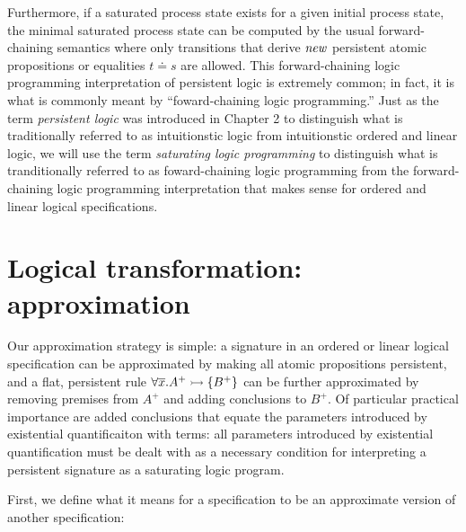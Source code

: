Furthermore, if a saturated process state exists for a given initial
process state, the minimal saturated process state can be computed by
the usual forward-chaining semantics where only transitions that
derive ${\it new}$ persistent atomic propositions or equalities $t
\doteq s$ are allowed. This forward-chaining logic programming
interpretation of persistent logic is extremely common; in fact, it is
what is commonly meant by ``foward-chaining logic programming.'' Just
as the term {\it persistent logic} was introduced in Chapter 2 to
distinguish what is traditionally referred to as intuitionstic logic
from intuitionstic ordered and linear logic, we will use the term
{\it saturating logic programming} to distinguish what is
tranditionally referred to as foward-chaining logic programming from
the forward-chaining logic programming interpretation that makes sense
for ordered and linear logical specifications.

\section{Logical transformation: approximation}
\label{sec:abstraction}

Our approximation strategy is simple: a signature in an ordered or
linear logical specification can be approximated by making all atomic
propositions persistent, and a flat, persistent rule $\forall
\overline{x}. A^+ \rightarrowtail \{ B^+ \}$ can be further approximated by
removing premises from $A^+$ and adding conclusions to $B^+$. Of
particular practical importance are added conclusions that equate the
parameters introduced by existential quantificaiton with terms: all
parameters introduced by existential quantification must be dealt with
as a necessary condition for interpreting a persistent signature as a
saturating logic program.

First, we define what it means for a specification to be an approximate
version of another specification:

